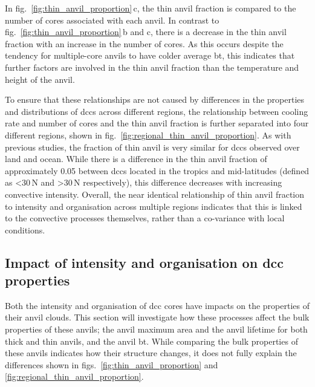 In fig.~\ref{fig:thin_anvil_proportion}\,c, the thin anvil fraction is compared to the number of cores associated with each anvil.
In contrast to fig.~\ref{fig:thin_anvil_proportion}\,b and c, there is a decrease in the thin anvil fraction with an increase in the number of cores.
As this occurs despite the tendency for multiple-core anvils to have colder average \acrshort{bt}, this indicates that further factors are involved in the thin anvil fraction than the temperature and height of the anvil.

To ensure that these relationships are not caused by differences in the properties and distributions of \acrshort{dcc}s across different regions, the relationship between cooling rate and number of cores and the thin anvil fraction is further separated into four different regions, shown in fig.~\ref{fig:regional_thin_anvil_proportion}.
As with previous studies, the fraction of thin anvil is very similar for \acrshort{dcc}s observed over land and ocean.
While there is a difference in the thin anvil fraction of approximately 0.05 between \acrshort{dcc}s located in the tropics and mid-latitudes (defined as \textless 30\,\textdegree N and \textgreater 30\,\textdegree N respectively), this difference decreases with increasing convective intensity.
Overall, the near identical relationship of thin anvil fraction to intensity and organisation across multiple regions indicates that this is linked to the convective processes themselves, rather than a co-variance with local conditions.

\subsection{Impact of intensity and organisation on \acrshort{dcc} properties}

Both the intensity and organisation of \acrshort{dcc} cores have impacts on the properties of their anvil clouds.
This section will investigate how these processes affect the bulk properties of these anvils; the anvil maximum area and the anvil lifetime for both thick and thin anvils, and the anvil \acrshort{bt}.
While comparing the bulk properties of these anvils indicates how their structure changes, it does not fully explain the differences shown in figs.~\ref{fig:thin_anvil_proportion} and \ref{fig:regional_thin_anvil_proportion}.

